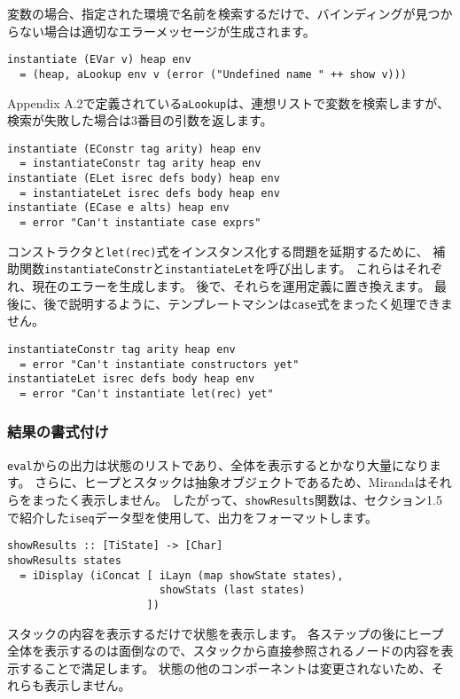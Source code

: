 \documentclass{jarticle}
\begin{document}
変数の場合、指定された環境で名前を検索するだけで、バインディングが見つからない場合は適切なエラーメッセージが生成されます。

\begin{verbatim}
instantiate (EVar v) heap env
  = (heap, aLookup env v (error ("Undefined name " ++ show v)))
\end{verbatim}

Appendix A.2で定義されている\texttt{aLookup}は、連想リストで変数を検索しますが、検索が失敗した場合は3番目の引数を返します。

\begin{verbatim}
instantiate (EConstr tag arity) heap env
  = instantiateConstr tag arity heap env
instantiate (ELet isrec defs body) heap env
  = instantiateLet isrec defs body heap env
instantiate (ECase e alts) heap env
  = error "Can't instantiate case exprs"
\end{verbatim}

コンストラクタと\texttt{let(rec)}式をインスタンス化する問題を延期するために、
補助関数\texttt{instantiateConstr}と\texttt{instantiateLet}を呼び出します。
これらはそれぞれ、現在のエラーを生成します。
後で、それらを運用定義に置き換えます。
最後に、後で説明するように、テンプレートマシンは\texttt{case}式をまったく処理できません。

\begin{verbatim}
instantiateConstr tag arity heap env
  = error "Can't instantiate constructors yet"
instantiateLet isrec defs body heap env
  = error "Can't instantiate let(rec) yet"
\end{verbatim}

\subsubsection{結果の書式付け}

\texttt{eval}からの出力は状態のリストであり、全体を表示するとかなり大量になります。
さらに、ヒープとスタックは抽象オブジェクトであるため、Mirandaはそれらをまったく表示しません。
したがって、\texttt{showResults}関数は、セクション1.5で紹介した\texttt{iseq}データ型を使用して、出力をフォーマットします。

\begin{verbatim}
showResults :: [TiState] -> [Char]
showResults states
  = iDisplay (iConcat [ iLayn (map showState states),
                        showStats (last states)
                      ])
\end{verbatim}

スタックの内容を表示するだけで状態を表示します。
各ステップの後にヒープ全体を表示するのは面倒なので、スタックから直接参照されるノードの内容を表示することで満足します。
状態の他のコンポーネントは変更されないため、それらも表示しません。
\end{document}
